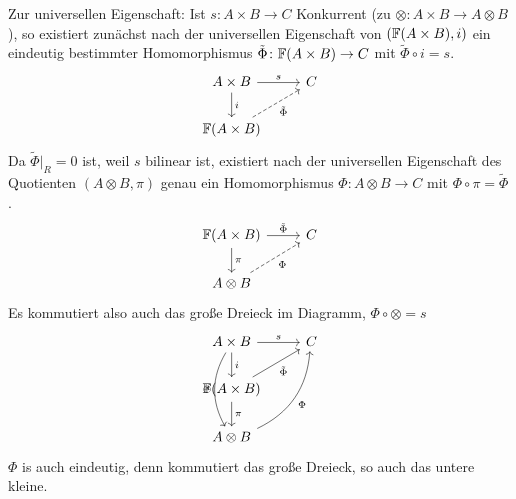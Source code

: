 \begin{kommentar}
\begin{enumerate}
    Zur universellen Eigenschaft:
    Ist $s \colon A \times B \to C$ Konkurrent (zu $\otimes \colon A \times B \to A \otimes B$), so existiert zunächst nach der universellen Eigenschaft von $(\mathbb{F}(A \times B), i)$ ein eindeutig bestimmter Homomorphismus $\tilde \Phi \colon \mathbb{F}(A \times B) \to C$ mit $\tilde \Phi \circ i = s$.
    \begin{equation*}
      \begin{tikzcd}
        A \times B \arrow{r}{s}
          \arrow{d}{i}
        & C\\
        \F(A \times B) \arrow[dashed,swap]{ur}{\tilde \Phi}
      \end{tikzcd}
    \end{equation*}
    Da $\tilde \Phi | _R = 0$ ist, weil $s$ bilinear ist, existiert nach der universellen Eigenschaft des Quotienten $(A \otimes B, \pi)$ genau ein Homomorphismus $\Phi \colon A \otimes B \to C$ mit $\Phi \circ \pi = \tilde \Phi$.
    \begin{equation*}
      \begin{tikzcd}
        \F(A \times B) \arrow{r}{\tilde \Phi}
          \arrow{d}{\pi}
        & C\\
        A \otimes B \arrow[dashed,swap]{ur}{\Phi}
      \end{tikzcd}
    \end{equation*}
    Es kommutiert also auch das große Dreieck im Diagramm, $\Phi \circ \otimes = s$
    \begin{equation*}
      \begin{tikzcd}
        A \times B \arrow{r}{s}
          \arrow{d}{i}
          \arrow[bend right,swap]{dd}{\oplus}
        & C\\
        \F(A \times B) \arrow[swap]{ur}{\tilde \Phi}
          \arrow{d}{\pi}
        \\
        A \otimes B \arrow[bend right,swap]{uur}{\Phi}
      \end{tikzcd}
    \end{equation*}
    $\Phi$ is auch eindeutig, denn kommutiert das große Dreieck, so auch das untere kleine.
  \end{enumerate}
\end{kommentar}

